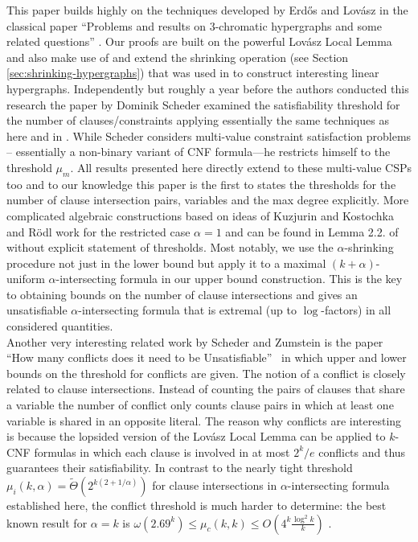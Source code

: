 \documentclass[11pt,letterpaper]{article}
\begin{document}
This paper builds highly on the techniques developed by Erd\H{o}s and Lov\'asz in the classical paper ``Problems and results on 3-chromatic hypergraphs and some related questions'' \cite{ErdoesLovasz}. Our proofs are built on the powerful Lov\'asz Local Lemma and also make use of and extend the shrinking operation (see Section \ref{sec:shrinking-hypergraphs}) that was used in \cite{ErdoesLovasz} to construct interesting linear hypergraphs. Independently but roughly a year before the authors conducted this research the paper \cite{scheder08almostdisjoint} by Dominik Scheder examined the satisfiability threshold for the number of clauses/constraints applying essentially the same techniques as here and in \cite{ErdoesLovasz}. While Scheder considers multi-value constraint satisfaction problems -- essentially a non-binary variant of CNF formula---he restricts himself to the threshold $\mu_m$. All results presented here directly extend to these multi-value CSPs too and to our knowledge this paper is the first to states the thresholds for the number of clause intersection pairs, variables and the max degree explicitly. More complicated algebraic constructions based on ideas of Kuzjurin \cite{Kuzjurin} and Kostochka and R\"{o}dl \cite{roedl} work for the restricted case $\alpha=1$ and can be found in Lemma 2.2. of \cite{Scheder10} without explicit statement of thresholds. Most notably, we use the $\alpha$-shrinking procedure not just in the lower bound but apply it to a maximal $(k+\alpha)$-uniform $\alpha$-intersecting formula in our upper bound construction. This is the key to obtaining bounds on the number of clause intersections and gives an unsatisfiable $\alpha$-intersecting formula that is extremal (up to $\log$-factors) in all considered quantities. \\


Another very interesting related work by Scheder and Zumstein is the paper ``How many conflicts does it need to be Unsatisfiable''~\cite{scheder08conflicts} in which upper and lower bounds on the threshold for conflicts are given. The notion of a conflict is closely related to clause intersections. Instead of counting the pairs of clauses that share a variable the number of conflict only counts clause pairs in which at least one variable is shared in an opposite literal. The reason why conflicts are interesting is because the lopsided version of the Lov\'asz Local Lemma \cite{erds1991lopsided} can be applied to $k$-CNF formulas in which each clause is involved in at most $2^k/e$ conflicts and thus guarantees their satisfiability. In contrast to the nearly tight threshold $\mu_i(k,\alpha) = \tilde{\Theta}(2^{k(2+1/\alpha)})$ for clause intersections in $\alpha$-intersecting formula established here, the conflict threshold is much harder to determine: the best known result for $\alpha=k$  is $\omega(2.69^k) \leq \mu_c(k,k) \leq O(4^k \frac{\log^2 k}{k})$ \cite{scheder08conflicts}.
\end{document}
